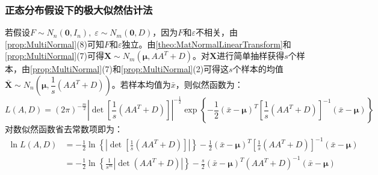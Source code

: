 \subsubsection{正态分布假设下的极大似然估计法}
\begin{derivation}
	若假设$F\sim N_n(\mathbf{0},I_n),\;\varepsilon\sim N_m(\mathbf{0},D)$，因为$F$和$\varepsilon$不相关，由\cref{prop:MultiNormal}(8)可知$F$和$\varepsilon$独立。由\cref{theo:MatNormalLinearTransform}和\cref{prop:MultiNormal}(7)可得$\mathbf{X}\sim N_m(\boldsymbol{\mu},AA^T+D)$。对$\mathbf{X}$进行简单抽样获得$s$个样本，由\cref{prop:MultiNormal}(7)和\cref{prop:MultiNormal}(2)可得这$s$个样本的均值$\bar{\mathbf{X}}\sim N_n\left(\boldsymbol{\mu},\dfrac{1}{s}(AA^T+D)\right)$。若样本均值为$\bar{x}$，则似然函数为：
	\begin{equation*}
		L(A,D)=(2\pi)^{-\frac{m}{2}}|\det[\frac{1}{s}(AA^T+D)]|^{-\frac{1}{2}}\exp\left\{-\frac{1}{2}(\bar{x}-\boldsymbol{\mu})^T\left[\frac{1}{s}(AA^T+D)\right]^{-1}(\bar{x}-\boldsymbol{\mu})\right\}
	\end{equation*}
	对数似然函数省去常数项即为：
	\begin{align*}
		\ln L(A,D)&=-\frac{1}{2}\ln\left\{\left|\det\left[\frac{1}{s}(AA^T+D)\right]\right|\right\}-\frac{1}{2}(\bar{x}-\boldsymbol{\mu})^T\left[\frac{1}{s}(AA^T+D)\right]^{-1}(\bar{x}-\boldsymbol{\mu}) \\
		&=-\frac{1}{2}\ln\left\{\frac{1}{s^m}\left|\det(AA^T+D)\right|\right\}-\frac{s}{2}(\bar{x}-\boldsymbol{\mu})^T(AA^T+D)^{-1}(\bar{x}-\boldsymbol{\mu})
	\end{align*}
\end{derivation}

